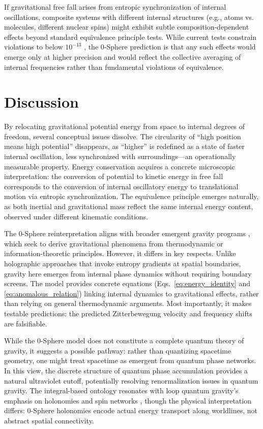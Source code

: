 \documentclass[%
 reprint,
 amsmath,amssymb,
 aps,
 prb,
]{revtex4-2}
\numberwithin{equation}{section}
\begin{document}
If gravitational free fall arises from entropic synchronization of internal oscillations, composite systems with different internal structures (e.g., atoms vs. molecules, different nuclear spins) might exhibit subtle composition-dependent effects beyond standard equivalence principle tests. While current tests constrain violations to below $10^{-13}$ \cite{Touboul2017}, the 0-Sphere prediction is that any such effects would emerge only at higher precision and would reflect the collective averaging of internal frequencies rather than fundamental violations of equivalence.

\section{Discussion}
\label{sec:discussion}

By relocating gravitational potential energy from space to internal degrees of freedom, several conceptual issues dissolve. The circularity of ``high position means high potential'' disappears, as ``higher'' is redefined as a state of faster internal oscillation, less synchronized with surroundings---an operationally measurable property. Energy conservation acquires a concrete microscopic interpretation: the conversion of potential to kinetic energy in free fall corresponds to the conversion of internal oscillatory energy to translational motion via entropic synchronization. The equivalence principle emerges naturally, as both inertial and gravitational mass reflect the same internal energy content, observed under different kinematic conditions.

The 0-Sphere reinterpretation aligns with broader emergent gravity programs \cite{Verlinde2011,Jacobson1995}, which seek to derive gravitational phenomena from thermodynamic or information-theoretic principles. However, it differs in key respects. Unlike holographic approaches that invoke entropy gradients at spatial boundaries, gravity here emerges from internal phase dynamics without requiring boundary screens. The model provides concrete equations (Eqs.~\ref{eq:energy_identity} and \ref{eq:anomalous_relation}) linking internal dynamics to gravitational effects, rather than relying on general thermodynamic arguments. Most importantly, it makes testable predictions: the predicted Zitterbewegung velocity and frequency shifts are falsifiable.

While the 0-Sphere model does not constitute a complete quantum theory of gravity, it suggests a possible pathway: rather than quantizing spacetime geometry, one might treat spacetime as emergent from quantum phase networks. In this view, the discrete structure of quantum phase accumulation provides a natural ultraviolet cutoff, potentially resolving renormalization issues in quantum gravity. The integral-based ontology resonates with loop quantum gravity's emphasis on holonomies and spin networks \cite{Rovelli2004}, though the physical interpretation differs: 0-Sphere holonomies encode actual energy transport along worldlines, not abstract spatial connectivity.
\end{document}
